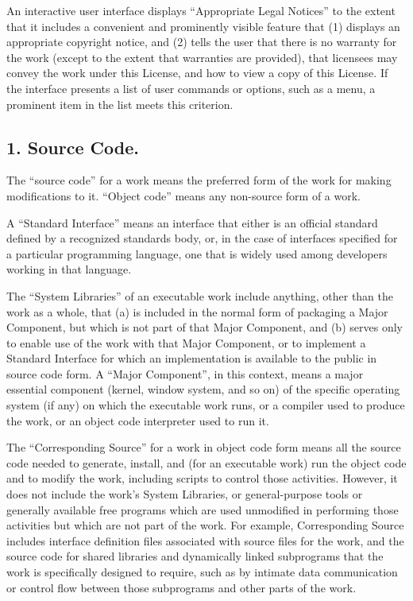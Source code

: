 \documentclass[letterpaper,10pt,english]{sphinxmanual}
\begin{document}
An interactive user interface displays ``Appropriate Legal Notices''
to the extent that it includes a convenient and prominently visible
feature that (1) displays an appropriate copyright notice, and (2)
tells the user that there is no warranty for the work (except to the
extent that warranties are provided), that licensees may convey the
work under this License, and how to view a copy of this License.  If
the interface presents a list of user commands or options, such as a
menu, a prominent item in the list meets this criterion.


\subsection{1. Source Code.}
\label{license:source-code}
The ``source code'' for a work means the preferred form of the work
for making modifications to it.  ``Object code'' means any non-source
form of a work.

A ``Standard Interface'' means an interface that either is an official
standard defined by a recognized standards body, or, in the case of
interfaces specified for a particular programming language, one that
is widely used among developers working in that language.

The ``System Libraries'' of an executable work include anything, other
than the work as a whole, that (a) is included in the normal form of
packaging a Major Component, but which is not part of that Major
Component, and (b) serves only to enable use of the work with that
Major Component, or to implement a Standard Interface for which an
implementation is available to the public in source code form.  A
``Major Component'', in this context, means a major essential component
(kernel, window system, and so on) of the specific operating system
(if any) on which the executable work runs, or a compiler used to
produce the work, or an object code interpreter used to run it.

The ``Corresponding Source'' for a work in object code form means all
the source code needed to generate, install, and (for an executable
work) run the object code and to modify the work, including scripts to
control those activities.  However, it does not include the work's
System Libraries, or general-purpose tools or generally available free
programs which are used unmodified in performing those activities but
which are not part of the work.  For example, Corresponding Source
includes interface definition files associated with source files for
the work, and the source code for shared libraries and dynamically
linked subprograms that the work is specifically designed to require,
such as by intimate data communication or control flow between those
subprograms and other parts of the work.
\end{document}
